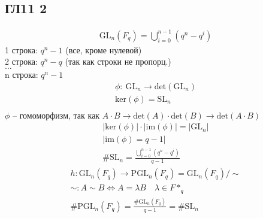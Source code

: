 \subsection*{ГЛ11 2}
\begin{gather*}
	\text{GL}_n(F_q) = \bigcup\limits_{i=0}^{n-1}(q^n - q^i)
\end{gather*}
1 строка: $q^n - 1$ (все, кроме нулевой)\\
2 строка: $q^n - q$ (так как строки не пропорц.)\\
$\ldots$\\
n строка: $q^n - 1$\\
\begin{gather*}
	\phi:\ \text{GL}_n \to \text{det}(\text{GL}_n)\\
	\text{ker}(\phi) = 	\text{SL}_n\\
\end{gather*}
$\phi$ -- гомоморфизм, так как $A \cdot B \to \text{det}(A) \cdot \text{det}(B) \to \text{det}(A \cdot B)$
\begin{gather*}
	|\text{ker}(\phi)| \cdot |\text{im}(\phi)| = |\text{GL}_n|\\
	|\text{im}(\phi) = q-1|\\
	\# \text{SL}_n = \frac{\bigcup\limits_{i=0}^{n-1}(q^n - q^i)}{q-1}
\end{gather*}
\begin{gather*}
	h: \text{GL}_n(F_q) \to \text{PGL}_n(F_q) = \text{GL}_n(F_q)/\sim\\
	\sim: A \sim B \Leftrightarrow A= \lambda B \quad \lambda \in F*_q\\
	\# \text{PGL}_n(F_q) = \frac{\# \text{GL}_n(F_q)}{q-1} = \#\text{SL}_n
\end{gather*}
		